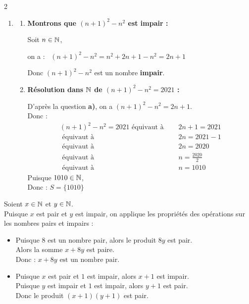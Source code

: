 \documentclass[10pt, a4paper]{article}
\begin{document}
\begin{multicols*}{2}
\begin{Solution}[APPLICATION][1]
\begin{enumerate}[leftmargin=*,itemsep=0.5pt]
    \item
    \begin{enumerate}[leftmargin=*,itemsep=0.5pt]
        \item \textbf{Montrons que $(n+1)^2 - n^2$ est impair :}

        Soit $n \in \mathbb{N}$,  
        
        on a :~  $(n+1)^2 - n^2 = n^2 + 2n + 1 - n^2 = 2n + 1$

        Donc $(n+1)^2 - n^2$ est un nombre \textbf{impair}.

        \item \textbf{Résolution dans $\mathbb{N}$ de $(n+1)^2 - n^2 = 2021$ :}

        D'après la question \textbf{a)}, on a $(n+1)^2 - n^2 = 2n + 1$. \\
        Donc :
        \begin{align*}
            (n+1)^2 - n^2 = 2021
            \text{ équivaut à } \quad & 2n + 1 = 2021 \\
            \text{ équivaut à } \quad & 2n = 2021 - 1 \\
            \text{ équivaut à } \quad & 2n = 2020 \\
            \text{ équivaut à } \quad & n = \frac{2020}{2} \\
            \text{ équivaut à } \quad & n = 1010
        \end{align*}
        Puisque $1010 \in \mathbb{N}$, \\
        Donc : \quad $S = \big\{1010\big\}$

    \end{enumerate}
\end{enumerate}
\end{Solution}

\begin{Solution}[APPLICATION][2]
Soient $x \in \mathbb{N}$ et $y \in \mathbb{N}$. \\
Puisque $x$ est pair et $y$ est impair, on applique les propriétés des opérations sur les nombres pairs et impairs :
\begin{itemize}[leftmargin=*,itemsep=0.5pt]
    \item Puisque $8$ est un nombre pair, alors le produit $8y$ est pair. \\
    Alors la somme $x + 8y$ est paire. \\
    Donc : $x + 8y \text{ est un nombre pair.}$

    \item Puisque $x$ est pair et $1$ est impair, alors $x + 1$ est impair. \\
    Puisque $y$ est impair et $1$ est impair, alors $y + 1$ est pair. \\
    Donc le produit $(x + 1)(y + 1)$ est pair.


\end{itemize}
\end{Solution}
\end{multicols*}
\end{document}
